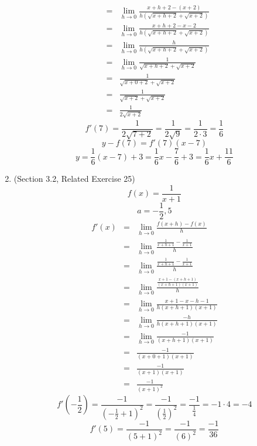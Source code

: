 \documentclass{article}
\begin{document}
\begin{enumerate}
\begin{eqnarray}
              &=& \lim_{h \to 0}{\frac{x + h + 2 - (x + 2)}{h(\sqrt{x + h + 2} + \sqrt{x + 2})}} \\
              &=& \lim_{h \to 0}{\frac{x + h + 2 - x - 2}{h(\sqrt{x + h + 2} + \sqrt{x + 2})}} \\
              &=& \lim_{h \to 0}{\frac{h}{h(\sqrt{x + h + 2} + \sqrt{x + 2})}} \\
              &=& \lim_{h \to 0}{\frac{1}{\sqrt{x + h + 2} + \sqrt{x + 2}}} \\
              &=& \frac{1}{\sqrt{x + 0 + 2} + \sqrt{x + 2}} \\
              &=& \frac{1}{\sqrt{x + 2} + \sqrt{x + 2}} \\
              &=& \frac{1}{2\sqrt{x + 2}}
    \end{eqnarray}
    $$f'(7) = \frac{1}{2\sqrt{7 + 2}} = \frac{1}{2\sqrt{9}} = \frac{1}{2 \cdot 3} = \frac{1}{6}$$
    $$y - f(7) = f'(7)(x - 7)$$
    $$y = \frac{1}{6}(x - 7) + 3 = \frac{1}{6}x - \frac{7}{6} + 3 = \frac{1}{6}x + \frac{11}{6}$$
    \item (Section 3.2, Related Exercise 25)
        $$f(x) = \frac{1}{x + 1}$$
        $$a = - \frac{1}{2}, 5$$
        \begin{eqnarray}
            f'(x) &=& \lim_{h \to 0}{\frac{f(x + h) - f(x)}{h}} \\
                  &=& \lim_{h \to 0}{\frac{\frac{1}{x + h + 1} - \frac{1}{x+1}}{h}} \\
                  &=& \lim_{h \to 0}{\frac{\frac{1}{x + h + 1} - \frac{1}{x+1}}{h}} \\
                  &=& \lim_{h \to 0}{\frac{\frac{x + 1 - (x + h + 1)}{(x + h + 1)(x + 1)}}{h}} \\
                  &=& \lim_{h \to 0}{\frac{x + 1 - x - h - 1}{h(x + h + 1)(x + 1)}} \\
                  &=& \lim_{h \to 0}{\frac{-h}{h(x + h + 1)(x + 1)}} \\
                  &=& \lim_{h \to 0}{\frac{-1}{(x + h + 1)(x + 1)}} \\
                  &=& \frac{-1}{(x + 0 + 1)(x + 1)} \\
                  &=& \frac{-1}{(x + 1)(x + 1)} \\
                  &=& \frac{-1}{(x + 1)^2}
        \end{eqnarray}
        $$f'(- \frac{1}{2}) = \frac{-1}{(- \frac{1}{2} + 1)^2} = \frac{-1}{(\frac{1}{2})^2} = \frac{-1}{\frac{1}{4}} = -1 \cdot 4 = -4$$
        $$f'(5) = \frac{-1}{(5 + 1)^2} = \frac{-1}{(6)^2} = \frac{-1}{36}$$

\end{enumerate}
\end{document}
